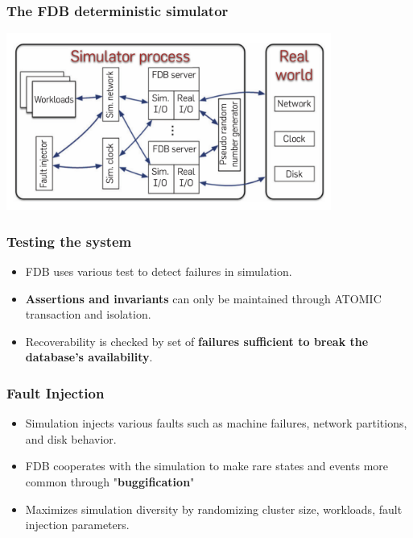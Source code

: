 
\begin{frame}
    \frametitle{The FDB deterministic simulator}
    \begin{center}
        \includegraphics[width=0.8\textwidth]{img/3-Testing/The FDB deterministic simulator.png}
    \end{center}
    
\end{frame}


\begin{frame}
    \frametitle{Testing the system}
    \begin{itemize}
        \item FDB uses various test to detect failures in simulation.
        \item \textbf{Assertions and invariants} can only be maintained through ATOMIC transaction and isolation.
        \item Recoverability is checked by set of \textbf{failures sufficient to break
the database’s availability}.
    \end{itemize}
\end{frame}
\begin{frame}
    \frametitle{Fault Injection}
    \begin{itemize}
        \item Simulation injects various faults such as machine failures, network partitions, and disk behavior.
        \item FDB cooperates with the simulation to make rare states and events more common through "\textbf{buggification}"
        \item Maximizes simulation diversity by randomizing cluster size, workloads, fault injection parameters.
    \end{itemize}
\end{frame}


